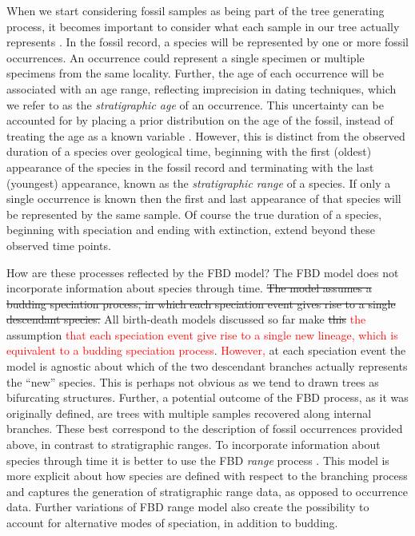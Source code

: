 \documentclass[11pt]{article}
\newcommand{\edit}[1]{{\textcolor{red}{#1}}} %
\begin{document}
When we start considering fossil samples as being part of the tree generating process, it becomes important to consider what each sample in our tree actually represents \cite{Hopkins2018}. 
In the fossil record, a species will be represented by one or more fossil occurrences.
An occurrence could represent a single specimen or multiple specimens from the same locality.
Further, the age of each occurrence will be associated with an age range, reflecting imprecision in dating techniques, which we refer to as the \textit{stratigraphic age} of an occurrence.
This uncertainty can be accounted for by placing a prior distribution on the age of the fossil, instead of treating the age as a known variable \cite{Drummond2016,BaridoSottani2019a}.
However, this is distinct from the observed duration of a species over geological time, beginning with the first (oldest) appearance of the species in the fossil record and terminating with the last (youngest) appearance, known as the \textit{stratigraphic range} of a species.
If only a single occurrence is known then the first and last appearance of that species will be represented by the same sample.
Of course the true duration of a species, beginning with speciation and ending with extinction, extend beyond these observed time points. 

How are these processes reflected by the FBD model?
The FBD model does not incorporate information about species through time.
\sout{The model assumes a budding speciation process, in  which each speciation event gives rise to a single descendant species.}
All birth-death models discussed so far make \sout{this} \edit{the} assumption \edit{that each speciation event give rise to a single new lineage, which is equivalent to a budding speciation process}. 
\edit{However,} at each speciation event the model is agnostic about which of the two descendant branches actually represents the ``new'' species.
This is perhaps not obvious as we tend to drawn trees as bifurcating structures.
Further, a potential outcome of the FBD process, as it was originally defined, are trees with multiple samples recovered along internal branches.
These best correspond to the description of fossil occurrences provided above, in contrast to stratigraphic ranges. 
To incorporate information about species through time it is better to use the FBD \textit{range} process \cite{Stadler2017}.
This model is more explicit about how species are defined with respect to the branching process and captures the generation of stratigraphic range data, as opposed to occurrence data.
Further variations of FBD range model also create the possibility to account for alternative modes of speciation, in addition to budding. %
\end{document}
